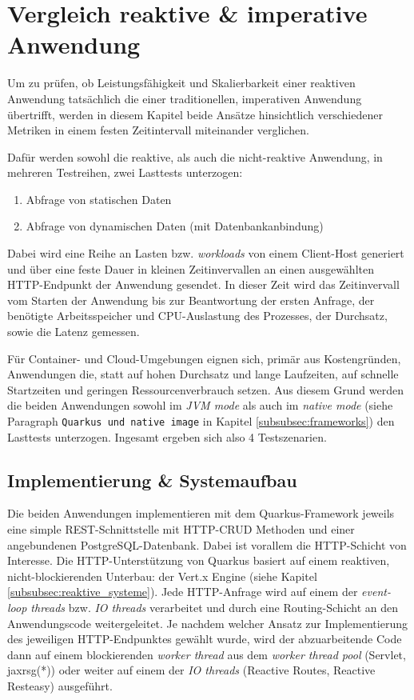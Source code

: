 \section {Vergleich reaktive \& imperative Anwendung}
\label{section:vergleich_reaktiv_imperativ}
Um zu prüfen, ob Leistungsfähigkeit und Skalierbarkeit einer reaktiven Anwendung tatsächlich die einer traditionellen, imperativen Anwendung
übertrifft, werden in diesem Kapitel beide Ansätze hinsichtlich verschiedener Metriken in einem festen Zeitintervall miteinander verglichen.

Dafür werden sowohl die reaktive, als auch die nicht-reaktive Anwendung, in mehreren Testreihen, zwei Lasttests unterzogen:
\begin{enumerate}
  \item Abfrage von statischen Daten
  \item Abfrage von dynamischen Daten (mit Datenbankanbindung)
\end{enumerate}
Dabei wird eine Reihe an Lasten bzw. \textit{workloads} von einem Client-Host generiert und über eine feste Dauer in kleinen Zeitinvervallen
an einen ausgewählten HTTP-Endpunkt der Anwendung gesendet.
In dieser Zeit wird das Zeitinvervall vom Starten der Anwendung bis zur Beantwortung der ersten Anfrage,
der benötigte Arbeitsspeicher und CPU-Auslastung des Prozesses, der Durchsatz, sowie die Latenz gemessen.

Für Container- und Cloud-Umgebungen eignen sich, primär aus Kostengründen, Anwendungen die, statt auf hohen Durchsatz und lange Laufzeiten, auf
schnelle Startzeiten und geringen Ressourcenverbrauch setzen.
Aus diesem Grund werden die beiden Anwendungen sowohl im \textit{JVM mode} als auch im \textit{native mode}
(siehe Paragraph \verb|Quarkus und native image| in Kapitel \ref{subsubsec:frameworks})
den Lasttests unterzogen. Ingesamt ergeben sich also 4 Testszenarien.

\subsection{Implementierung \& Systemaufbau}
\label{section:implementierung}
Die beiden Anwendungen implementieren mit dem Quarkus-Framework jeweils eine simple REST-Schnittstelle mit HTTP-CRUD Methoden
und einer angebundenen PostgreSQL-Datenbank.
Dabei ist vorallem die HTTP-Schicht von Interesse. Die HTTP-Unterstützung von Quarkus basiert auf einem reaktiven, nicht-blockierenden
Unterbau: der Vert.x Engine (siehe Kapitel \ref{subsubsec:reaktive_systeme}).
Jede HTTP-Anfrage wird auf einem der \textit{event-loop threads} bzw. \textit{IO threads}
verarbeitet und durch eine Routing-Schicht an den Anwendungscode weitergeleitet.
Je nachdem welcher Ansatz zur Implementierung des jeweiligen HTTP-Endpunktes gewählt wurde,
wird der abzuarbeitende Code dann auf einem blockierenden \textit{worker thread} aus dem \textit{worker thread pool}
(Servlet, \Gls{jaxrsg}(*)) oder weiter auf einem der \textit{IO threads} (Reactive Routes, Reactive Resteasy) ausgeführt.

